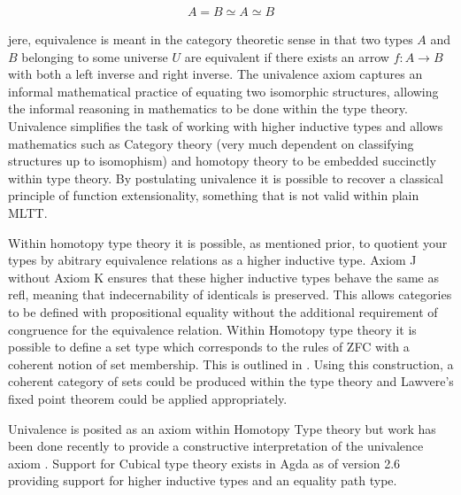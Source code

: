 \begin{align*}
    A = B \simeq A \simeq B
\end{align*}

jere, equivalence is meant in the category theoretic sense in that
two types $A$ and $B$ belonging to some universe $U$ are equivalent if there
exists an arrow $f : A \rightarrow B$ with both a left inverse and right
inverse. The univalence axiom captures an informal mathematical practice of
equating two isomorphic structures, allowing the informal reasoning in
mathematics to be done within the type theory. Univalence simplifies the task of
working with higher inductive types and allows mathematics such as Category
theory (very much dependent on classifying structures up to isomophism) and
homotopy theory to be embedded succinctly within type theory. By postulating
univalence it is possible to recover a classical principle of function
extensionality, something that is not valid within plain MLTT.

Within homotopy type theory it is possible, as mentioned prior, to quotient your
types by abitrary equivalence relations as a higher inductive type.
\textsf{Axiom J} without \textsf{Axiom K} ensures that these higher inductive
types behave the same as \textsf{refl}, meaning that indecernability of identicals
is preserved. This allows categories to be defined with propositional equality
without the additional requirement of congruence for the equivalence relation.
Within Homotopy type theory it is possible to define a set type which
corresponds to the rules of ZFC with a coherent notion of set membership. This
is outlined in . Using this construction, a coherent category of sets
could be produced within the type theory and Lawvere's fixed point theorem could
be applied appropriately.

Univalence is posited as an axiom within Homotopy Type theory but work has been
done recently to provide a constructive interpretation of the univalence axiom
.  Support for Cubical type theory exists in Agda as of version
2.6 providing support for higher inductive types and an equality path type.

